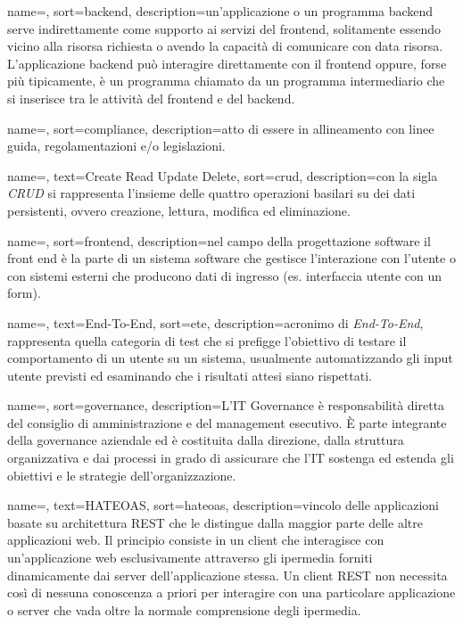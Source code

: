{
	name=,
	sort=backend,
	description={un'applicazione o un programma backend serve indirettamente come supporto ai servizi del frontend, solitamente essendo vicino alla risorsa richiesta o avendo la capacità di comunicare con data risorsa. L'applicazione backend può interagire direttamente con il frontend oppure, forse più tipicamente, è un programma chiamato da un programma intermediario che si inserisce tra le attività del frontend e del backend.}
}

{
	name=,
	sort=compliance,
	description={atto di essere in allineamento con linee guida, regolamentazioni e/o legislazioni.}
}

{
	name=,
	text=Create Read Update Delete,
	sort=crud,
	description={con la sigla \emph{CRUD} si rappresenta l'insieme delle quattro operazioni basilari su dei dati persistenti, ovvero creazione, lettura, modifica ed eliminazione.}
}

{
	name=,
	sort=frontend,
	description={nel campo della progettazione software il front end è la parte di un sistema software che gestisce l'interazione con l'utente o con sistemi esterni che producono dati di ingresso (es. interfaccia utente con un form).}
}

{
	name=,
	text=End-To-End,
	sort=ete,
	description={acronimo di \emph{End-To-End}, rappresenta quella categoria di test che si prefigge l'obiettivo di testare il comportamento di un utente su un sistema, usualmente automatizzando gli input utente previsti ed esaminando che i risultati attesi siano rispettati.}
}

{
	name=,
	sort=governance,
	description={L'IT Governance è responsabilità diretta del consiglio di amministrazione e del management esecutivo. \`{E} parte integrante della governance aziendale ed è costituita dalla direzione, dalla struttura organizzativa e dai processi in grado di assicurare che l'IT sostenga ed estenda gli obiettivi e le strategie dell'organizzazione.}
}

{
	name=,
	text=HATEOAS,
	sort=hateoas,
	description={vincolo delle applicazioni basate su architettura REST che le distingue dalla maggior parte delle altre applicazioni web. Il principio consiste in un client che interagisce con un'applicazione web esclusivamente attraverso gli ipermedia forniti dinamicamente dai server dell'applicazione stessa. Un client REST non necessita così di nessuna conoscenza a priori per interagire con una particolare applicazione o server che vada oltre la normale comprensione degli ipermedia.}
}

